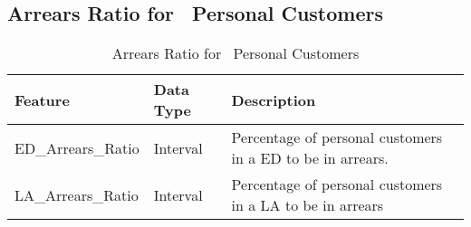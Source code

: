 \subsection{Arrears Ratio for \subjectname\ Personal Customers}
\begin{table}[H]
	\centering
	\label{my-label}
	\begin{tabular}{|l|l|p{8cm}|}
		\hline
		\textbf{Feature} & \textbf{Data Type} & \textbf{Description}                                                                                                                                                                                                                                                                                                                                                                                                                                                                                                                              \\ \hline
		ED\_Arrears\_Ratio          & Interval        & Percentage of personal customers in a ED to be in arrears.                                                                                                                                                                                                                                                                                                                                                                           \\ 
		LA\_Arrears\_Ratio           & Interval        & Percentage of personal customers in a LA to be in arrears \\ \hline
	\end{tabular}
	\caption{Arrears Ratio for \subjectname\ Personal Customers }
\end{table}

